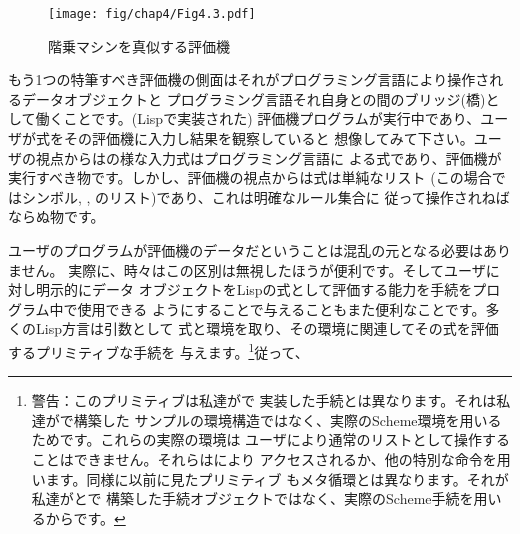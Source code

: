 \begin{figure}[tb]
\label{Figure 4.3}
\centering
\begin{comment}
\heading{Figure 4.3:} The evaluator emulating a factorial machine.

\begin{example}
                   +--------+
            6 ---->|  eval  |----> 720
                   +--------+
                       /
             . . .    /  . . .
       . . .       ../. .      .
     .                           ..
    .   (define (factorial n)      . . .
   .      (if (= n 1)                   . .
    .         1                            .
    .         (* (factorial (- n 1)) n)))   .
      . .                       . .        .
          . .  . .      . . . .     . . . .
                   . ..
\end{example}
\end{comment}
\texttt{[image: fig/chap4/Fig4.3.pdf]}
\par\bigskip
\noindent
{} 階乗マシンを真似する評価機
\end{figure}

\noindent
もう1つの特筆すべき評価機の側面はそれがプログラミング言語により操作されるデータオブジェクトと
プログラミング言語それ自身との間のブリッジ(橋)として働くことです。(Lispで実装された)
評価機プログラムが実行中であり、ユーザが式をその評価機に入力し結果を観察していると
想像してみて下さい。ユーザの視点からはの様な入力式はプログラミング言語に
よる式であり、評価機が実行すべき物です。しかし、評価機の視点からは式は単純なリスト
(この場合ではシンボル\code{*}, , のリスト)であり、これは明確なルール集合に
従って操作されねばならぬ物です。

ユーザのプログラムが評価機のデータだということは混乱の元となる必要はありません。
実際に、時々はこの区別は無視したほうが便利です。そしてユーザに対し明示的にデータ
オブジェクトをLispの式として評価する能力を手続をプログラム中で使用できる
ようにすることで与えることもまた便利なことです。多くのLisp方言は引数として
式と環境を取り、その環境に関連してその式を評価するプリミティブな手続を
与えます。\footnote{警告：このプリミティブは私達がで
実装した手続とは異なります。それは私達がで構築した
サンプルの環境構造ではなく、実際のScheme環境を用いるためです。これらの実際の環境は
ユーザにより通常のリストとして操作することはできません。それらはにより
アクセスされるか、他の特別な命令を用います。同様に以前に見たプリミティブ
もメタ循環とは異なります。それが私達がとで
構築した手続オブジェクトではなく、実際のScheme手続を用いるからです。}従って、

